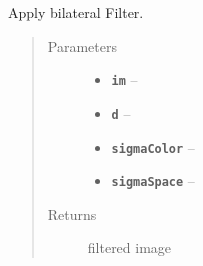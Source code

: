 \documentclass[letterpaper,10pt,english]{sphinxmanual}
\begin{document}
\begin{fulllineitems}
\label{RRtoolbox.lib.arrayops:RRtoolbox.lib.arrayops.filters.bilateralFilter}
Apply bilateral Filter.
\begin{quote}\begin{description}
\item[{Parameters}] \leavevmode\begin{itemize}
\item {} 
\textbf{\texttt{im}} -- 

\item {} 
\textbf{\texttt{d}} -- 

\item {} 
\textbf{\texttt{sigmaColor}} -- 

\item {} 
\textbf{\texttt{sigmaSpace}} -- 

\end{itemize}

\item[{Returns}] \leavevmode
filtered image

\end{description}\end{quote}

\end{fulllineitems}

\end{document}
